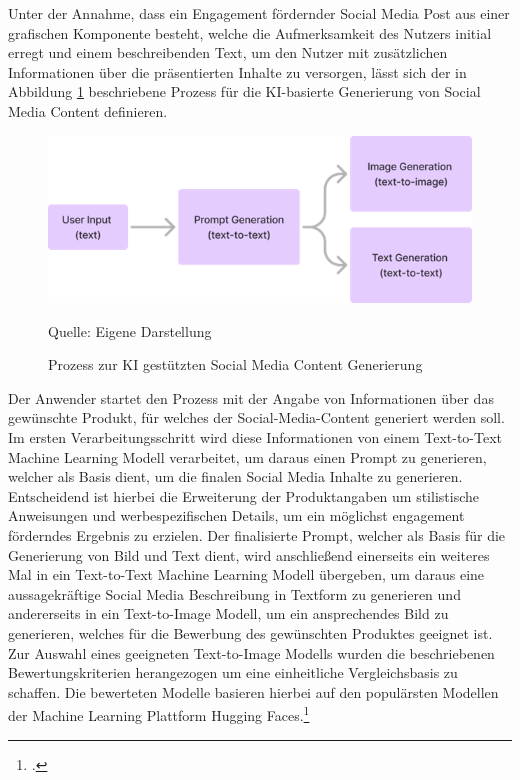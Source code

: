 Unter der Annahme, dass ein Engagement fördernder Social Media Post aus einer grafischen Komponente besteht, welche die Aufmerksamkeit des Nutzers initial erregt und einem beschreibenden Text, um den Nutzer mit zusätzlichen Informationen über die präsentierten Inhalte zu versorgen, lässt sich der in Abbildung \ref{fig:process_content_generation} beschriebene Prozess für die KI-basierte Generierung von Social Media Content definieren.
\begin{figure}[H]
    \centering
    \includegraphics[width=\textwidth]{abbildungen/Process_image_generation}
    \caption{Prozess zur KI gestützten Social Media Content Generierung}
    \label{fig:process_content_generation}
    \vspace{0.5cm}
    \raggedright Quelle: Eigene Darstellung
\end{figure}

Der Anwender startet den Prozess mit der Angabe von Informationen über das gewünschte Produkt, für welches der Social-Media-Content generiert werden soll.
Im ersten Verarbeitungsschritt wird diese Informationen von einem Text-to-Text Machine Learning Modell verarbeitet, um daraus einen Prompt zu generieren, welcher als Basis dient, um die finalen Social Media Inhalte zu generieren.
Entscheidend ist hierbei die Erweiterung der Produktangaben um stilistische Anweisungen und werbespezifischen Details, um ein möglichst engagement förderndes Ergebnis zu erzielen.
Der finalisierte Prompt, welcher als Basis für die Generierung von Bild und Text dient, wird anschließend einerseits ein weiteres Mal in ein Text-to-Text Machine Learning Modell übergeben, um daraus eine aussagekräftige Social Media Beschreibung in Textform zu generieren und andererseits in ein Text-to-Image Modell, um ein ansprechendes Bild zu generieren, welches für die Bewerbung des gewünschten Produktes geeignet ist.
Zur Auswahl eines geeigneten Text-to-Image Modells wurden die beschriebenen Bewertungskriterien herangezogen um eine einheitliche Vergleichsbasis zu schaffen.
Die bewerteten Modelle basieren hierbei auf den populärsten Modellen der Machine Learning Plattform Hugging Faces.\footcite{huggingface_models}

